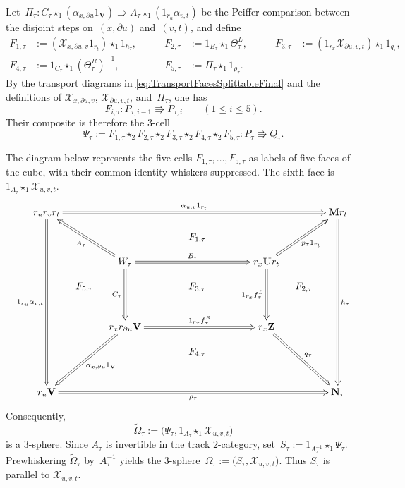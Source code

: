 \documentclass[a4paper, twoside, 11pt, english]{article}
\begin{document}
Let~$
\Pi_\tau\colon
C_\tau\star_1(\alpha_{x,\partial u}1_{\mathbf V})
\Rrightarrow
A_\tau\star_1(1_{r_u}\alpha_{v,t})$
be the Peiffer comparison between the disjoint steps on~$(x,\partial u)$ and~$(v,t)$, and define
\[
\begin{alignedat}{3}
F_{1,\tau}
&:=
(\mathcal X_{x,\partial u,v}1_{r_t})
\star_1 1_{h_\tau},
\qquad&
F_{2,\tau}
&:=
1_{B_\tau}\star_1\Theta_\tau^L,
\qquad&
F_{3,\tau}
&:=
(1_{r_x}\mathcal X_{\partial u,v,t})
\star_1 1_{q_\tau},
\\[1mm]
F_{4,\tau}
&:=
1_{C_\tau}\star_1(\Theta_\tau^R)^{-1},
&
F_{5,\tau}
&:=
\Pi_\tau\star_1 1_{\rho_\tau}.
&
&&
\end{alignedat}
\]
By the transport diagrams in
\eqref{eq:TransportFacesSplittableFinal}
and the definitions of
$\mathcal X_{x,\partial u,v}$,
$\mathcal X_{\partial u,v,t}$, and~$\Pi_\tau$, one has
\[
F_{i,\tau}\colon
P_{\tau,i-1}\Rrightarrow P_{\tau,i}
\qquad
(1\leq i\leq5).
\]
Their composite is therefore the $3$-cell
\[
\Psi_\tau
:=
F_{1,\tau}
\star_2F_{2,\tau}
\star_2F_{3,\tau}
\star_2F_{4,\tau}
\star_2F_{5,\tau}
\colon
P_\tau\Rrightarrow Q_\tau.
\]

The diagram below represents the five cells
$F_{1,\tau},\ldots,F_{5,\tau}$ as labels of five faces of the cube,
with their common identity whiskers suppressed. The sixth face is~$1_{A_\tau}\star_1\mathcal X_{u,v,t}$.
\[
\xymatrix @C=1em @R=1em{
r_ur_vr_t
  \ar@2[rrrrrrrrrr]^-{\alpha_{u,v}1_{r_t}}
  \ar@2[dddddddd]_-{1_{r_u}\alpha_{v,t}}
&&&&&&&&&&
\mathbf M r_t
  \ar@2[dddddddd]^-{h_\tau}
\\
&&&&& { F_{1,\tau}} &&&&&
\\
&&
W_\tau
  \ar@2[uull]^-{A_\tau}
  \ar@2[rrrrrr]^-{B_\tau}
  \ar@2[ddd]_-{C_\tau}
&&&&&&
r_x\mathbf U r_t
  \ar@2[uurr]_-{p_\tau1_{r_t}}
  \ar@2[ddd]_-{1_{r_x}f_\tau^L}
&&
\\
& { F_{5,\tau}}
&&&& { F_{3,\tau}}
&&&& { F_{2,\tau}} &
\\
&&&&&&&&&&
\\
&&
r_xr_{\partial u}\mathbf V
  \ar@2[dddll]^-{\alpha_{x,\partial u}1_{\mathbf V}}
  \ar@2[rrrrrr]^-{1_{r_x}f_\tau^R}
&&&&&&
r_x\mathbf Z
  \ar@2[dddrr]^-{q_\tau}
&&
\\
&&&&& { F_{4,\tau}} &&&&&
\\
&&&&&&&&&&
\\
r_u\mathbf V
  \ar@2[rrrrrrrrrr]_-{\rho_\tau}
&&&&&&&&&&
\mathbf N_\tau
}
\]
Consequently,
\[
\widetilde\Omega_\tau
:=
\bigl(
\Psi_\tau,
1_{A_\tau}\star_1\mathcal X_{u,v,t}
\bigr)
\]
is a $3$-sphere. Since $A_\tau$ is invertible in the track
$2$-category, set~$
S_\tau
:=
1_{A_\tau^{-1}}\star_1\Psi_\tau$.
Prewhiskering $\widetilde\Omega_\tau$ by~$A_\tau^{-1}$ yields the
$3$-sphere~$
\Omega_\tau
:=
\bigl(
S_\tau,
\mathcal X_{u,v,t}
\bigr)$.
Thus $S_\tau$ is parallel to
$\mathcal X_{u,v,t}$.
\end{document}
